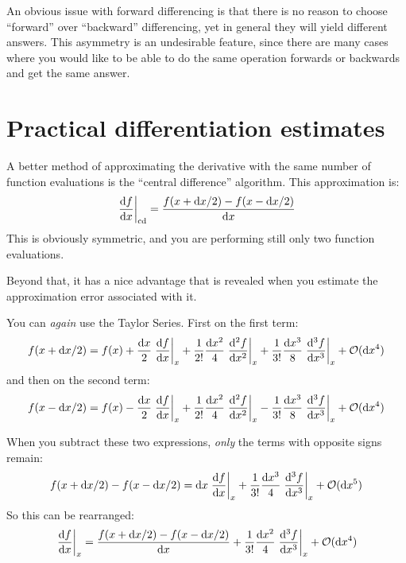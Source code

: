 An obvious issue with forward differencing is that there is no reason
to choose ``forward'' over ``backward'' differencing, yet in general
they will yield different answers. This asymmetry is an undesirable
feature, since there are many cases where you would like to be able to
do the same operation forwards or backwards and get the same answer.

\section{Practical differentiation estimates}

A better method of approximating the derivative with the same number
of function evaluations is the ``central difference'' algorithm.  This
approximation is:
\begin{equation}
  \left.\frac{{\rm d}f}{{\rm d}x}\right|_{\rm cd} =
  \frac{f(x+{\rm d}x / 2) - f(x-{\rm d}x / 2)}{{\rm d}x}
\end{equation}
This is obviously symmetric, and you are performing still only two
function evaluations. 

Beyond that, it has a nice advantage that is revealed when you
estimate the approximation error associated with it. 


\begin{answer}
You can {\it again} use the Taylor Series. First on the first term:
  \begin{equation}
    f(x + {\rm d}x / 2) = f(x)
    + \frac{{\rm d}x}{2} \left.\frac{{\rm d}f}{{\rm d}x}\right|_{x} 
    + \frac{1}{2!} \frac{{\rm d}x^2}{4} \left.\frac{{\rm d}^2f}{{\rm d}x^2}\right|_{x} 
    + \frac{1}{3!} \frac{{\rm d}x^3}{8} \left.\frac{{\rm d}^3f}{{\rm d}x^3}\right|_{x} 
    + \mathcal{O}({\rm d}x^4)
  \end{equation}
and then on the second term:
  \begin{equation}
    f(x - {\rm d}x / 2) = f(x)
    - \frac{{\rm d}x}{2} \left.\frac{{\rm d}f}{{\rm d}x}\right|_{x} 
    + \frac{1}{2!} \frac{{\rm d}x^2}{4} \left.\frac{{\rm d}^2f}{{\rm d}x^2}\right|_{x} 
    - \frac{1}{3!} \frac{{\rm d}x^3}{8} \left.\frac{{\rm d}^3f}{{\rm d}x^3}\right|_{x} 
    + \mathcal{O}({\rm d}x^4)
  \end{equation}

  When you subtract these two expressions, {\it only} the terms with
  opposite signs remain:
  \begin{equation}
    f(x + {\rm d}x / 2) - f(x - {\rm d}x / 2) = 
    {\rm d}x \left.\frac{{\rm d}f}{{\rm d}x}\right|_{x} 
    + \frac{1}{3!} \frac{{\rm d}x^3}{4} \left.\frac{{\rm d}^3f}{{\rm d}x^3}\right|_{x} 
    + \mathcal{O}({\rm d}x^5)
  \end{equation}
  So this can be rearranged:
  \begin{equation}
    \left.\frac{{\rm d}f}{{\rm d}x}\right|_{x}  = 
    \frac{f(x + {\rm d}x / 2) - f(x - {\rm d}x / 2)}{{\rm d}x}
    + \frac{1}{3!} \frac{{\rm d}x^2}{4} \left.\frac{{\rm d}^3f}{{\rm d}x^3}\right|_{x} 
    + \mathcal{O}({\rm d}x^4)
  \end{equation}
\end{answer}

